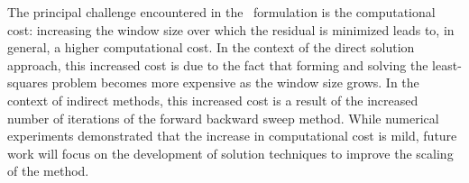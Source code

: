 \documentclass[3p,computermodern,10pt]{elsarticle}
\begin{document}
 
The principal challenge encountered in the \methodAcronym\ formulation is the computational cost: increasing the window size over which the residual is minimized leads to, in general, a higher computational cost. In the context of the direct solution approach, this increased cost is due to the fact that forming and solving the least-squares problem becomes more expensive as the window size grows. In the context of indirect methods, this increased cost is a result of the increased number of iterations of the forward backward sweep method. While numerical experiments demonstrated that the increase in computational cost is mild, future work will focus on the development of solution techniques to improve the scaling of the method.

 


\end{document}
